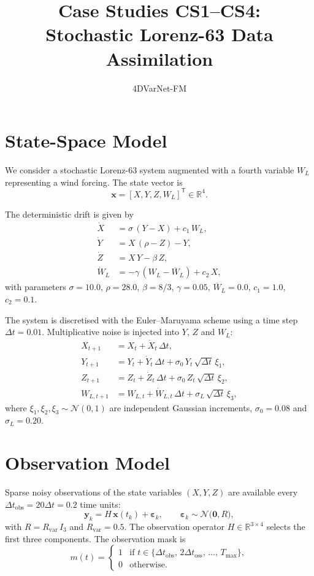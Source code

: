 \documentclass[11pt,a4paper]{article}
\title{Case Studies CS1--CS4:\\Stochastic Lorenz-63 Data Assimilation}
\author{4DVarNet-FM}
\date{}
\begin{document}
\maketitle

\section{State-Space Model}

We consider a stochastic Lorenz-63 system augmented with a fourth variable $W_L$ representing a wind forcing. The state vector is
\[
\mathbf{x} = [X, Y, Z, W_L]^{\mathsf T} \in \mathbb{R}^{4}.
\]

The deterministic drift is given by
\begin{align}
\dot X &= \sigma\,(Y - X) + c_1\,W_L,\\
\dot Y &= X\,(\rho - Z) - Y,\\
\dot Z &= X\,Y - \beta\,Z,\\
\dot W_L &= -\gamma\,(W_L - \overline W_L) + c_2\,X,
\end{align}
with parameters $\sigma = 10.0$, $\rho = 28.0$, $\beta = 8/3$, $\gamma = 0.05$, $\overline W_L = 0.0$, $c_1 = 1.0$, $c_2 = 0.1$.

The system is discretised with the Euler--Maruyama scheme using a time step $\Delta t = 0.01$. Multiplicative noise is injected into $Y$, $Z$ and $W_L$:
\begin{align}
X_{t+1} &= X_t + \dot X_t\,\Delta t,\\
Y_{t+1} &= Y_t + \dot Y_t\,\Delta t + \sigma_0\,Y_t\,\sqrt{\Delta t}\,\xi_1,\\
Z_{t+1} &= Z_t + \dot Z_t\,\Delta t + \sigma_0\,Z_t\,\sqrt{\Delta t}\,\xi_2,\\
W_{L,t+1} &= W_{L,t} + \dot W_{L,t}\,\Delta t + \sigma_L\,\sqrt{\Delta t}\,\xi_3,
\end{align}
where $\xi_1, \xi_2, \xi_3 \sim \mathcal{N}(0,1)$ are independent Gaussian increments, $\sigma_0 = 0.08$ and $\sigma_L = 0.20$.

\section{Observation Model}

Sparse noisy observations of the state variables $(X,Y,Z)$ are available every $\Delta t_{\text{obs}}=20\Delta t = 0.2$ time units:
\[
\mathbf{y}_k = H\,\mathbf{x}(t_k) + \boldsymbol\varepsilon_k,\qquad
\boldsymbol\varepsilon_k \sim \mathcal{N}\bigl(\mathbf{0}, R\bigr),
\]
with $R = R_{\text{var}}\,I_3$ and $R_{\text{var}} = 0.5$. The observation operator $H\in\mathbb{R}^{3\times4}$ selects the first three components. The observation mask is
\[
m(t) = \begin{cases}
1 & \text{if } t \in \{\Delta t_{\text{obs}},\,2\Delta t_{\text{oss}},\,\dots,\,T_{\max}\},\\
0 & \text{otherwise}.
\end{cases}
\]
\end{document}
